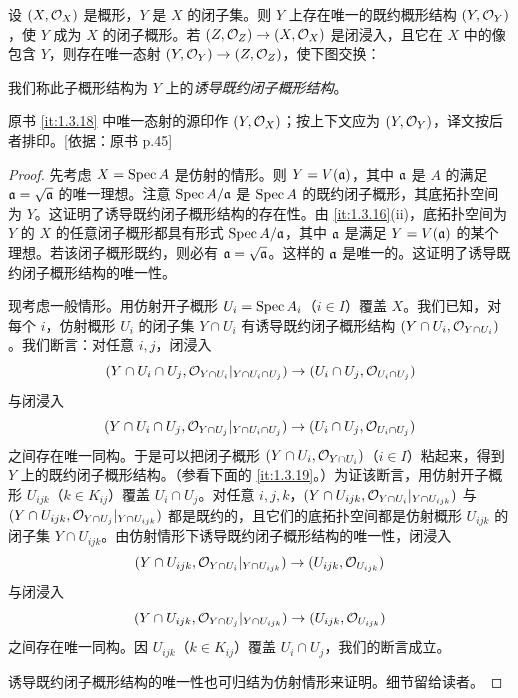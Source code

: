 
\begin{proposition}\label{it:1.3.18}
设 $(X,\mathcal{O}_X)$ 是概形，$Y$ 是 $X$ 的闭子集。则 $Y$ 上存在唯一的既约概形结构 $(Y,\mathcal{O}_Y)$，使 $Y$ 成为 $X$ 的闭子概形。若 $(Z,\mathcal{O}_Z)\to (X,\mathcal{O}_X)$ 是闭浸入，且它在 $X$ 中的像包含 $Y$，则存在唯一态射 $(Y,\mathcal{O}_Y)\to (Z,\mathcal{O}_Z)$，使下图交换：
\begin{center}
\end{center}
我们称此子概形结构为 $Y$ 上的\emph{诱导既约闭子概形结构}。
\end{proposition}

\begin{tnote}
原书 \ref{it:1.3.18} 中唯一态射的源印作 $(Y,\mathcal{O}_X)$；按上下文应为 $(Y,\mathcal{O}_Y)$，译文按后者排印。[依据：原书 p.45]
\end{tnote}

\begin{proof}
先考虑 $X=\operatorname{Spec} A$ 是仿射的情形。则 $Y=V(\mathfrak{a})$，其中 $\mathfrak{a}$ 是 $A$ 的满足 $\mathfrak{a}=\sqrt{\mathfrak{a}}$ 的唯一理想。注意 $\operatorname{Spec} A/\mathfrak{a}$ 是 $\operatorname{Spec} A$ 的既约闭子概形，其底拓扑空间为 $Y$。这证明了诱导既约闭子概形结构的存在性。由 \ref{it:1.3.16}(ii)，底拓扑空间为 $Y$ 的 $X$ 的任意闭子概形都具有形式 $\operatorname{Spec} A/\mathfrak{a}$，其中 $\mathfrak{a}$ 是满足 $Y=V(\mathfrak{a})$ 的某个理想。若该闭子概形既约，则必有 $\mathfrak{a}=\sqrt{\mathfrak{a}}$。这样的 $\mathfrak{a}$ 是唯一的。这证明了诱导既约闭子概形结构的唯一性。

现考虑一般情形。用仿射开子概形 $U_i=\operatorname{Spec} A_i$（$i\in I$）覆盖 $X$。我们已知，对每个 $i$，仿射概形 $U_i$ 的闭子集 $Y\cap U_i$ 有诱导既约闭子概形结构 $(Y\cap U_i,\mathcal{O}_{Y\cap U_i})$。我们断言：对任意 $i,j$，闭浸入
\[
(Y\cap U_i\cap U_j,\mathcal{O}_{Y\cap U_i}|_{Y\cap U_i\cap U_j})\to (U_i\cap U_j,\mathcal{O}_{U_i\cap U_j})
\]
与闭浸入
\[
(Y\cap U_i\cap U_j,\mathcal{O}_{Y\cap U_j}|_{Y\cap U_i\cap U_j})\to (U_i\cap U_j,\mathcal{O}_{U_i\cap U_j})
\]
之间存在唯一同构。于是可以把闭子概形 $(Y\cap U_i,\mathcal{O}_{Y\cap U_i})$（$i\in I$）粘起来，得到 $Y$ 上的既约闭子概形结构。（参看下面的 \ref{it:1.3.19}。）为证该断言，用仿射开子概形 $U_{ijk}$（$k\in K_{ij}$）覆盖 $U_i\cap U_j$。对任意 $i,j,k$，$(Y\cap U_{ijk},\mathcal{O}_{Y\cap U_i}|_{Y\cap U_{ijk}})$ 与 $(Y\cap U_{ijk},\mathcal{O}_{Y\cap U_j}|_{Y\cap U_{ijk}})$ 都是既约的，且它们的底拓扑空间都是仿射概形 $U_{ijk}$ 的闭子集 $Y\cap U_{ijk}$。由仿射情形下诱导既约闭子概形结构的唯一性，闭浸入
\[
(Y\cap U_{ijk},\mathcal{O}_{Y\cap U_i}|_{Y\cap U_{ijk}})\to (U_{ijk},\mathcal{O}_{U_{ijk}})
\]
与闭浸入
\[
(Y\cap U_{ijk},\mathcal{O}_{Y\cap U_j}|_{Y\cap U_{ijk}})\to (U_{ijk},\mathcal{O}_{U_{ijk}})
\]
之间存在唯一同构。因 $U_{ijk}$（$k\in K_{ij}$）覆盖 $U_i\cap U_j$，我们的断言成立。

诱导既约闭子概形结构的唯一性也可归结为仿射情形来证明。细节留给读者。
\end{proof}

